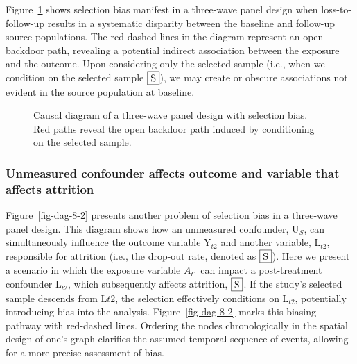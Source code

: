 \documentclass[
  singlecolumn]{article}
\begin{document}
Figure~\ref{fig-dag-8} shows selection bias manifest in a three-wave
panel design when loss-to-follow-up results in a systematic disparity
between the baseline and follow-up source populations. The red dashed
lines in the diagram represent an open backdoor path, revealing a
potential indirect association between the exposure and the outcome.
Upon considering only the selected sample (i.e., when we condition on
the selected sample \(\framebox{S}\)), we may create or obscure
associations not evident in the source population at baseline.

\begin{figure}


\caption{\label{fig-dag-8}Causal diagram of a three-wave panel design
with selection bias. Red paths reveal the open backdoor path induced by
conditioning on the selected sample.}

\end{figure}%

\subsubsection{Unmeasured confounder affects outcome and variable that
affects
attrition}\label{unmeasured-confounder-affects-outcome-and-variable-that-affects-attrition}

Figure~\ref{fig-dag-8-2} presents another problem of selection bias in a
three-wave panel design. This diagram shows how an unmeasured
confounder, U\(_S\), can simultaneously influence the outcome variable
Y\(_{t2}\) and another variable, L\(_{t2}\), responsible for attrition
(i.e., the drop-out rate, denoted as \(\framebox{S}\)). Here we present
a scenario in which the exposure variable \(A_{t1}\) can impact a
post-treatment confounder L\(_{t2}\), which subsequently affects
attrition, \(\framebox{S}\). If the study's selected sample descends
from L\({t2}\), the selection effectively conditions on L\(_{t2}\),
potentially introducing bias into the analysis. Figure~\ref{fig-dag-8-2}
marks this biasing pathway with red-dashed lines. Ordering the nodes
chronologically in the spatial design of one's graph clarifies the
assumed temporal sequence of events, allowing for a more precise
assessment of bias.
\end{document}

